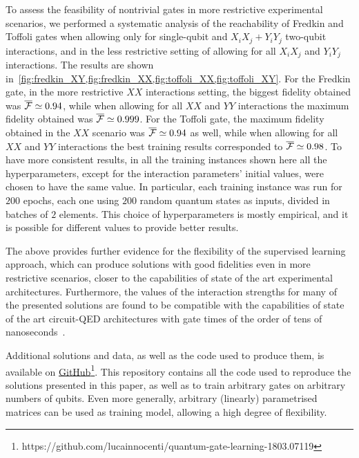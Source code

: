 To assess the feasibility of nontrivial gates in more restrictive experimental scenarios, we performed a systematic analysis of the reachability of Fredkin and Toffoli gates when allowing only for single-qubit and $X_i X_j+Y_i Y_j$ two-qubit interactions, and in the less restrictive setting of allowing for all $X_i X_j$ and $Y_i Y_j$ interactions.
The results are shown in~\cref{fig:fredkin_XY,fig:fredkin_XX,fig:toffoli_XX,fig:toffoli_XY}.
For the Fredkin gate, in the more restrictive $XX$ interactions setting, the biggest fidelity obtained was $\overline{{\mathcal{F}}}\simeq 0.94$, while when allowing for all $XX$ and $YY$ interactions the maximum fidelity obtained was $\overline{{\mathcal{F}}}\simeq0.999$.
For the Toffoli gate, the maximum fidelity obtained in the $XX$ scenario was $\overline{{\mathcal{F}}}\simeq0.94$ as well, while when allowing for all $XX$ and $YY$ interactions the best training results corresponded to $\overline{{\mathcal{F}}}\simeq 0.98$.
To have more consistent results, in all the training instances shown here all the hyperparameters, except for the interaction parameters' initial values, were chosen to have the same value.
In particular, each training instance was run for $200$ epochs, each one using $200$ random quantum states as inputs, divided in batches of $2$ elements.
This choice of hyperparameters is mostly empirical, and it is possible for different values to provide better results.


The above provides further evidence for the flexibility of the supervised learning approach, which can produce solutions with good fidelities even in more restrictive scenarios, closer to the capabilities of state of the art experimental architectures.
Furthermore, the values of the interaction strengths for many of the presented solutions are found to be compatible with the capabilities of state of the art circuit-QED architectures with gate times of the order of tens of nanoseconds~\cite{potočnik2018studying}.

Additional solutions and data, as well as the code used to produce them, is available on \href{https://github.com/lucainnocenti/quantum-gate-learning-1803.07119}{GitHub}\footnote{https://github.com/lucainnocenti/quantum-gate-learning-1803.07119}.
This repository contains all the code used to reproduce the solutions presented in this paper, as well as to train arbitrary gates on arbitrary numbers of qubits.
Even more generally, arbitrary (linearly) parametrised matrices can be used as training model, allowing a high degree of flexibility.

